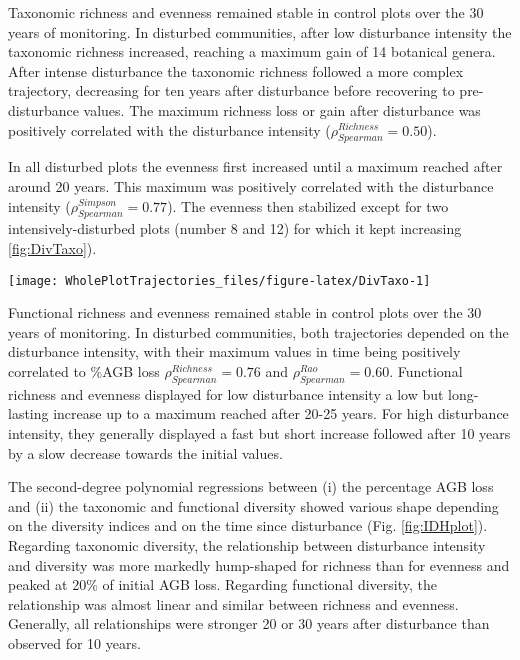 \documentclass[fleqn,10pt]{ArtEcoFoG} %
\begin{document}
Taxonomic richness and evenness remained stable in control plots over
the 30 years of monitoring. In disturbed communities, after low
disturbance intensity the taxonomic richness increased, reaching a
maximum gain of 14 botanical genera. After intense disturbance the
taxonomic richness followed a more complex trajectory, decreasing for
ten years after disturbance before recovering to pre-disturbance values.
The maximum richness loss or gain after disturbance was positively
correlated with the disturbance intensity
(\(\rho_{Spearman}^{Richness}=0.50\)).

In all disturbed plots the evenness first increased until a maximum
reached after around 20 years. This maximum was positively correlated
with the disturbance intensity (\(\rho_{Spearman}^{Simpson}=0.77\)). The
evenness then stabilized except for two intensively-disturbed plots
(number 8 and 12) for which it kept increasing \ref{fig:DivTaxo}).

\begin{figure*}

{\centering \texttt{[image: WholePlotTrajectories\_files/figure-latex/DivTaxo-1]} 

}

\caption{Trajectories of community taxonomic richness \textbf{(a)}, Simpson diversity \textbf{(b)}, functional richness \textbf{(c)}, and Rao diversity \textbf{(d)}. Values correspond to the difference over 30 years of community diversity with the values of reference 1984 pre-disturbance inventories. Shaded areas are the credibility intervals }\label{fig:DivTaxo}
\end{figure*}

Functional richness and evenness remained stable in control plots over
the 30 years of monitoring. In disturbed communities, both trajectories
depended on the disturbance intensity, with their maximum values in time
being positively correlated to \%AGB loss
\(\rho_{Spearman}^{Richness}=0.76\) and \(\rho_{Spearman}^{Rao}=0.60\).
Functional richness and evenness displayed for low disturbance intensity
a low but long-lasting increase up to a maximum reached after 20-25
years. For high disturbance intensity, they generally displayed a fast
but short increase followed after 10 years by a slow decrease towards
the initial values.

The second-degree polynomial regressions between (i) the percentage AGB
loss and (ii) the taxonomic and functional diversity showed various
shape depending on the diversity indices and on the time since
disturbance (Fig. \ref{fig:IDHplot}). Regarding taxonomic diversity, the
relationship between disturbance intensity and diversity was more
markedly hump-shaped for richness than for evenness and peaked at 20\%
of initial AGB loss. Regarding functional diversity, the relationship
was almost linear and similar between richness and evenness. Generally,
all relationships were stronger 20 or 30 years after disturbance than
observed for 10 years.
\end{document}

